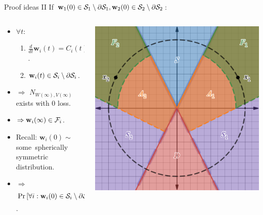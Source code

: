 \documentclass[handout,usenames,dvipsnames]{beamer} %
\newcommand{\bx}{\mathbf{x}}
\newcommand{\bw}{\mathbf{w}}
\newcommand{\cf}{{\cal F}}
\newcommand{\cs}{{\cal S}}
\begin{document}
\begin{frame}{Proof ideas II}
    If $\bw_1(0) \in \cs_1 \setminus \partial \cs_1, \bw_2(0) \in \cs_2 \setminus \partial \cs_2$:
    \begin{columns}[T]
        \begin{column}{0.55\textwidth}
            \begin{itemize}[<+->]
                \item $\forall t:$
                \begin{enumerate}
                    \item $\frac{d}{dt} \bw_i(t) = C_i(t) \bx_i, C_i(t) \geq 0$.
                    \item $\bw_i(t) \in \cs_i \setminus \partial \cs_i$.
                \end{enumerate}
                \item $\Rightarrow$ $N_{W(\infty),V(\infty)}$ exists with $0$ loss.
                \item $\Rightarrow \bw_i(\infty) \in \cf_i$.
                \item Recall: $\bw_i(0) \sim$ some~spherically symmetric distribution.
                \item $\Rightarrow$ $\Pr \left[ \forall i : \bw_i(0) \in \cs_i \setminus \partial \cs_i \right] \ge 2 \cdot \left(\frac{\measuredangle(\bx_1,\bx_2)}{2\pi} \right)^2$.
                \hfill\qedsymbol
            \end{itemize}
        \end{column}

        \begin{column}{0.45\textwidth}
            \begin{center}
                \includegraphics[width=\textwidth]{figures/F_and_A_regions.png}%
            \end{center}
        \end{column}
    \end{columns}
    

\end{frame}
\end{document}
